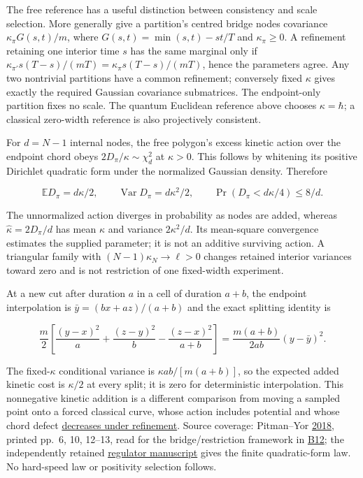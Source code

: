 \documentclass[11pt,a4paper]{article}
\begin{document}
The free reference has a useful distinction between consistency and
scale selection. More generally give a partition's centred bridge nodes
covariance \(\kappa_\pi G(s,t)/m\), where \(G(s,t)=\min(s,t)-st/T\) and
\(\kappa_\pi\ge0\). A refinement retaining one interior time \(s\) has
the same marginal only if
\(\kappa_{\pi'}s(T-s)/(mT)=\kappa_\pi s(T-s)/(mT)\), hence the
parameters agree. Any two nontrivial partitions have a common
refinement; conversely fixed \(\kappa\) gives exactly the required
Gaussian covariance submatrices. The endpoint-only partition fixes no
scale. The quantum Euclidean reference above chooses \(\kappa=\hbar\); a
classical zero-width reference is also projectively consistent.

For \(d=N-1\) internal nodes, the free polygon's excess kinetic action
over the endpoint chord obeys \(2D_\pi/\kappa\sim\chi_d^2\) at
\(\kappa>0\). This follows by whitening its positive Dirichlet quadratic
form under the normalized Gaussian density. Therefore

\[\mathbb ED_\pi=d\kappa/2,\qquad
\operatorname{Var}D_\pi=d\kappa^2/2,\qquad
\Pr(D_\pi<d\kappa/4)\le8/d.\]

The unnormalized action diverges in probability as nodes are added,
whereas \(\widehat\kappa=2D_\pi/d\) has mean \(\kappa\) and variance
\(2\kappa^2/d\). Its mean-square convergence estimates the supplied
parameter; it is not an additive surviving action. A triangular family
with \((N-1)\kappa_N\to\ell>0\) changes retained interior variances
toward zero and is not restriction of one fixed-width experiment.

At a new cut after duration \(a\) in a cell of duration \(a+b\), the
endpoint interpolation is \(\bar y=(bx+az)/(a+b)\) and the exact
splitting identity is

\[\frac m2\left[\frac{(y-x)^2}a+\frac{(z-y)^2}b
 -\frac{(z-x)^2}{a+b}\right]
 =\frac{m(a+b)}{2ab}(y-\bar y)^2.\]

The fixed-\(\kappa\) conditional variance is \(\kappa ab/[m(a+b)]\), so
the expected added kinetic cost is \(\kappa/2\) at every split; it is
zero for deterministic interpolation. This nonnegative kinetic addition
is a different comparison from moving a sampled point onto a forced
classical curve, whose action includes potential and whose chord defect
\href{newton-insertion-action.md\#matched-endpoints-arbitrary-partitions-and-action-normalization}{decreases
under refinement}. Source coverage: Pitman--Yor
\href{https://arxiv.org/abs/1802.09679v1}{2018}, printed pp.~6, 10,
12--13, read for the bridge/restriction framework in
\href{../references/batches/B12.md}{B12}; the independently retained
\href{../papers/regulator-limits.tex}{regulator manuscript} gives the
finite quadratic-form law. No hard-speed law or positivity selection
follows.
\end{document}
